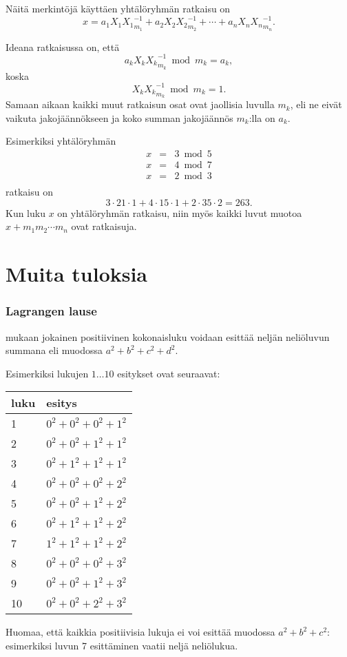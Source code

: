 Näitä merkintöjä käyttäen yhtälöryhmän ratkaisu on
\[x = a_1 X_1 {X_1}^{-1}_{m_1} + a_2 X_2 {X_2}^{-1}_{m_2} + \cdots + a_n X_n {X_n}^{-1}_{m_n}.\]

Ideana ratkaisussa on, että
\[a_k X_k {X_k}^{-1}_{m_k} \bmod m_k = a_k,\]
koska
\[X_k {X_k}^{-1}_{m_k} \bmod m_k = 1.\]
Samaan aikaan kaikki muut ratkaisun osat ovat jaollisia luvulla
$m_k$, eli ne eivät vaikuta jakojäännökseen ja
koko summan jakojäännös $m_k$:lla on $a_k$.

Esimerkiksi yhtälöryhmän
\[
\begin{array}{lcl}
x & = & 3 \bmod 5 \\
x & = & 4 \bmod 7 \\
x & = & 2 \bmod 3 \\
\end{array}
\]
ratkaisu on
\[ 3 \cdot 21 \cdot 1 + 4 \cdot 15 \cdot 1 + 2 \cdot 35 \cdot 2 = 263.\]
Kun luku $x$ on yhtälöryhmän ratkaisu,
niin myös kaikki luvut muotoa
$x+m_1 m_2 \cdots m_n$ ovat ratkaisuja.

\section{Muita tuloksia}

\subsubsection{Lagrangen lause}


 mukaan jokainen positiivinen kokonaisluku voidaan
esittää neljän neliöluvun summana eli muodossa $a^2+b^2+c^2+d^2$.

Esimerkiksi lukujen $1 \ldots 10$ esitykset ovat seuraavat:

\begin{center}
\begin{tabular}{ll}
luku & esitys \\
\hline
1 & $0^2+0^2+0^2+1^2$ \\
2 & $0^2+0^2+1^2+1^2$ \\
3 & $0^2+1^2+1^2+1^2$ \\
4 & $0^2+0^2+0^2+2^2$ \\
5 & $0^2+0^2+1^2+2^2$ \\
6 & $0^2+1^2+1^2+2^2$ \\
7 & $1^2+1^2+1^2+2^2$ \\
8 & $0^2+0^2+0^2+3^2$ \\
9 & $0^2+0^2+1^2+3^2$ \\
10 & $0^2+0^2+2^2+3^2$ \\
\end{tabular}
\end{center}
Huomaa, että kaikkia positiivisia lukuja ei voi esittää
muodossa $a^2+b^2+c^2$: esimerkiksi luvun 7
esittäminen vaatii neljä neliölukua.

